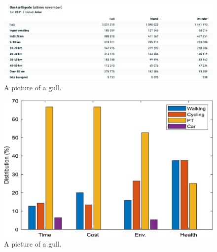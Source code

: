\begin{figure}[h]
    \centering
    \includegraphics[width=\textwidth]{images/stats}
    \caption{A picture of a gull.}
    \label{fig:figure}
\end{figure}

\begin{figure}
    \includegraphics[width=\textwidth]{images/stats-2}
    \caption{A picture of a gull.}
    \label{fig:figure2}
\end{figure}
